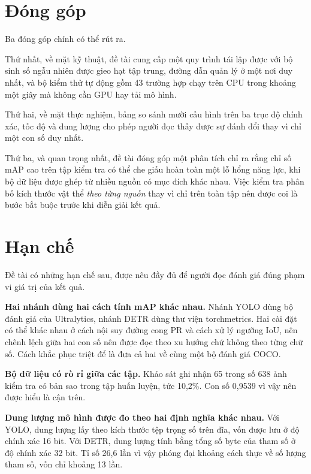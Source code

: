 \section{Đóng góp}

Ba đóng góp chính có thể rút ra.

Thứ nhất, về mặt kỹ thuật, đề tài cung cấp một quy trình tái lập được với bộ sinh số ngẫu nhiên
được gieo hạt tập trung, đường dẫn quản lý ở một nơi duy nhất, và bộ kiểm thử tự động gồm 43
trường hợp chạy trên CPU trong khoảng một giây mà không cần GPU hay tải mô hình.

Thứ hai, về mặt thực nghiệm, bảng so sánh mười cấu hình trên ba trục độ chính xác, tốc độ và dung
lượng cho phép người đọc thấy được sự đánh đổi thay vì chỉ một con số duy nhất.

Thứ ba, và quan trọng nhất, đề tài đóng góp một phân tích chỉ ra rằng chỉ số mAP cao trên tập kiểm
tra có thể che giấu hoàn toàn một lỗ hổng năng lực, khi bộ dữ liệu được ghép từ nhiều nguồn có mục
đích khác nhau. Việc kiểm tra phân bố kích thước vật thể \emph{theo từng nguồn} thay vì chỉ trên
toàn tập nên được coi là bước bắt buộc trước khi diễn giải kết quả.

\section{Hạn chế}

Đề tài có những hạn chế sau, được nêu đầy đủ để người đọc đánh giá đúng phạm vi giá trị của kết
quả.

\textbf{Hai nhánh dùng hai cách tính mAP khác nhau.} Nhánh YOLO dùng bộ đánh giá của Ultralytics,
nhánh DETR dùng thư viện torchmetrics. Hai cài đặt có thể khác nhau ở cách nội suy đường cong PR
và cách xử lý ngưỡng IoU, nên chênh lệch giữa hai con số nên được đọc theo xu hướng chứ không theo
từng chữ số. Cách khắc phục triệt để là đưa cả hai về cùng một bộ đánh giá COCO.

\textbf{Bộ dữ liệu có rò rỉ giữa các tập.} Khảo sát ghi nhận 65 trong số 638 ảnh kiểm tra có bản
sao trong tập huấn luyện, tức 10,2\%. Con số 0,9539 vì vậy nên được hiểu là cận trên.

\textbf{Dung lượng mô hình được đo theo hai định nghĩa khác nhau.} Với YOLO, dung lượng lấy theo
kích thước tệp trọng số trên đĩa, vốn được lưu ở độ chính xác 16 bit. Với DETR, dung lượng tính
bằng tổng số byte của tham số ở độ chính xác 32 bit. Tỉ số 26,6 lần vì vậy phóng đại khoảng cách
thực về số lượng tham số, vốn chỉ khoảng 13 lần.

